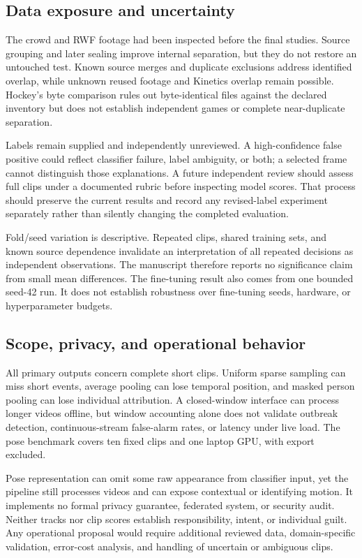 \documentclass[journal]{IEEEtai}
\begin{document}
\subsection{Data exposure and uncertainty}
The crowd and RWF footage had been inspected before the final studies. Source grouping and later sealing improve internal separation, but they do not restore an untouched test. Known source merges and duplicate exclusions address identified overlap, while unknown reused footage and Kinetics overlap remain possible. Hockey's byte comparison rules out byte-identical files against the declared inventory but does not establish independent games or complete near-duplicate separation.

Labels remain supplied and independently unreviewed. A high-confidence false positive could reflect classifier failure, label ambiguity, or both; a selected frame cannot distinguish those explanations. A future independent review should assess full clips under a documented rubric before inspecting model scores. That process should preserve the current results and record any revised-label experiment separately rather than silently changing the completed evaluation.

Fold/seed variation is descriptive. Repeated clips, shared training sets, and known source dependence invalidate an interpretation of all repeated decisions as independent observations. The manuscript therefore reports no significance claim from small mean differences. The fine-tuning result also comes from one bounded seed-42 run. It does not establish robustness over fine-tuning seeds, hardware, or hyperparameter budgets.

\subsection{Scope, privacy, and operational behavior}
All primary outputs concern complete short clips. Uniform sparse sampling can miss short events, average pooling can lose temporal position, and masked person pooling can lose individual attribution. A closed-window interface can process longer videos offline, but window accounting alone does not validate outbreak detection, continuous-stream false-alarm rates, or latency under live load. The pose benchmark covers ten fixed clips and one laptop GPU, with export excluded.

Pose representation can omit some raw appearance from classifier input, yet the pipeline still processes videos and can expose contextual or identifying motion. It implements no formal privacy guarantee, federated system, or security audit. Neither tracks nor clip scores establish responsibility, intent, or individual guilt. Any operational proposal would require additional reviewed data, domain-specific validation, error-cost analysis, and handling of uncertain or ambiguous clips.
\end{document}
